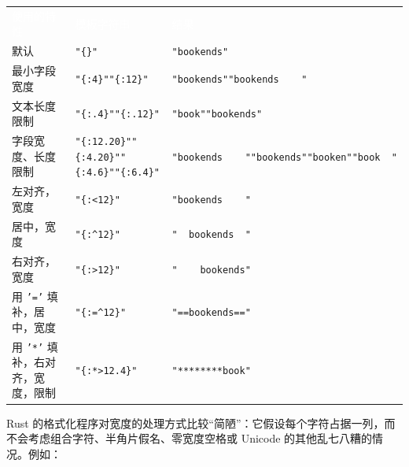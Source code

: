 \myTableBegin
\begin{tabularx}{\textwidth}{@{}>{\hsize=0.546\hsize\raggedright\arraybackslash}X>{\hsize=1.227\hsize\raggedright\arraybackslash}X>{\hsize=1.227\hsize\raggedright\arraybackslash}X@{}}
\rowcolor{tabhead}\textcolor{white}{使用的特性} & \textcolor{white}{模板字符串} & \textcolor{white}{结果} \\
默认 & \texttt{"\{\}"} & \texttt{"bookends"} \\
最小字段宽度 & \texttt{"\{:4\}"}\newline{}\texttt{"\{:12\}"} & \texttt{"bookends"}\newline{}\texttt{"bookends    "} \\
文本长度限制 & \texttt{"\{:.4\}"}\newline{}\texttt{"\{:.12\}"} & \texttt{"book"}\newline{}\texttt{"bookends"} \\
字段宽度、长度限制 & \texttt{"\{:12.20\}"}\newline{}\texttt{"\{:4.20\}"}\newline{}\texttt{"\{:4.6\}"}\newline{}\texttt{"\{:6.4\}"} & \texttt{"bookends    "}\newline{}\texttt{"bookends"}\newline{}\texttt{"booken"}\newline{}\texttt{"book  "} \\
左对齐，宽度 & \texttt{"\{:<12\}"} & \texttt{"bookends    "} \\
居中，宽度 & \texttt{"\{:\textasciicircum{}12\}"} & \texttt{"  bookends  "} \\
右对齐，宽度 & \texttt{"\{:>12\}"} & \texttt{"    bookends"} \\
用 \texttt{'='} 填补，居中，宽度 & \texttt{"\{:=\textasciicircum{}12\}"} & \texttt{"==bookends=="} \\
用 \texttt{'*'} 填补，右对齐，宽度，限制 & \texttt{"\{:*>12.4\}"} & \texttt{"********book"} \\
\end{tabularx}
\myTableEnd

Rust 的格式化程序对宽度的处理方式比较“简陋”：它假设每个字符占据一列，而不会考虑组合字符、半角片假名、零宽度空格或 Unicode 的其他乱七八糟的情况。例如：

